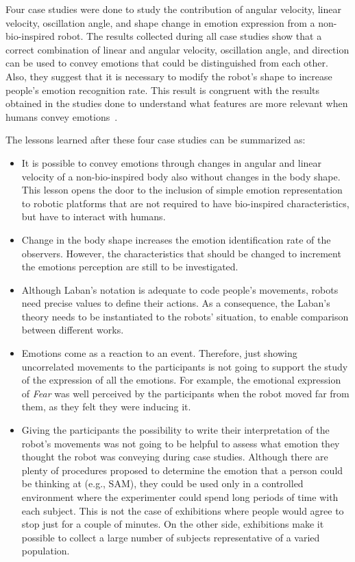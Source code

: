 Four case studies were done to study the contribution of angular velocity, linear velocity, oscillation angle, and shape change in emotion expression from a non-bio-inspired robot. The results collected during all case studies show that a correct combination of linear and angular velocity, oscillation angle, and direction can be used to convey emotions that could be distinguished from each other. Also, they suggest that it is necessary to modify the robot's shape to increase people's emotion recognition rate. This result is congruent with the results obtained in the studies done to understand what features are more relevant when humans convey emotions~\cite{Roether2009,Venture2014}.

The lessons learned after these four case studies can be summarized as:

\begin{itemize}
	
	\item It is possible to convey emotions through changes in angular and linear velocity of a non-bio-inspired body also without changes in the body shape. This lesson opens the door to the inclusion of simple emotion representation to robotic platforms that are not required to have bio-inspired characteristics, but have to interact with humans.
	
	\item Change in the body shape increases the emotion identification rate of the observers. However, the characteristics that should be changed to increment the emotions perception are still to be investigated.
	
	\item Although Laban's notation is adequate to code people's movements, robots need precise values to define their actions. As a consequence, the Laban's theory needs to be instantiated to the robots' situation, to enable comparison between different works.
	
	\item Emotions come as a reaction to an event. Therefore, just showing uncorrelated movements to the participants is not going to support the study of the expression of all the emotions. For example, the emotional expression of \textit{Fear} was well perceived by the participants when the robot moved far from them, as they felt they were inducing it.
	
	\item Giving the participants the possibility to write their interpretation of the robot's movements was not going to be helpful to assess what emotion they thought the robot was conveying during case studies. Although there are plenty of procedures proposed to determine the emotion that a person could be thinking at (e.g., SAM), they could be used only in a controlled environment where the experimenter could spend long periods of time with each subject. This is not the case of exhibitions where people would agree to stop just for a couple of minutes. On the other side, exhibitions make it possible to collect a large number of subjects representative of a varied population.
	

\end{itemize}

